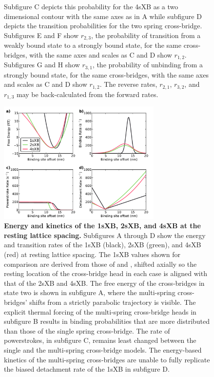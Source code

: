 \documentclass[]{article}
\begin{document}
\begin{figure}[htbp]
\begin{center}
{        Subfigure C depicts this probability for the 4sXB as a two dimensional contour with the same axes as in A while subfigure D depicts the transition probabilities for the two spring cross-bridge.
        Subfigures E and F show $r_{2,3}$, the probability of transition from a weakly bound state to a strongly bound state, for the same cross-bridges, with the same axes and scales as C and D show $r_{1,2}$.
        Subfigures G and H show $r_{3,1}$, the probability of unbinding from a strongly bound state, for the same cross-bridges, with the same axes and scales as C and D show $r_{1,2}$.
        The reverse rates, $r_{2,1}$, $r_{3,2}$, and $r_{1,3}$ may be back-calculated from the forward rates.
    }
    \end{center}
\end{figure}

\begin{figure}[htbp]
    \begin{center}
    \includegraphics[width=3.2in]{../imgs/Figure3.pdf}
    \caption{
        \label{fig_kinetics_cuts}
        \textbf{Energy and kinetics of the 1sXB, 2sXB, and 4sXB at the resting lattice spacing.}
        Subfigures A through D show the energy and transition rates of the 1sXB (black), 2sXB (green), and 4sXB (red) at resting lattice spacing.
        The 1sXB values shown for comparison are derived from those of \citet{Daniel1998} and \citet{Tanner2007}, shifted axially so the resting location of the cross-bridge head in each case is aligned with that of the 2sXB and 4sXB. 
        The free energy of the cross-bridges in state two is shown in subfigure A, where the multi-spring cross-bridges' shifts from a strictly parabolic trajectory is visible.
        The explicit thermal forcing of the multi-spring cross-bridge heads in subfigure B results in binding probabilities that are more distributed than those of the single spring cross-bridge.
        The rate of powerstrokes, in subfigure C, remains least changed between the single and the multi-spring cross-bridge models.
        The energy-based kinetics of the multi-spring cross-bridges are unable to fully replicate the biased detachment rate of the 1sXB in subfigure D. 
    }
    \end{center}
\end{figure}
\end{document}
